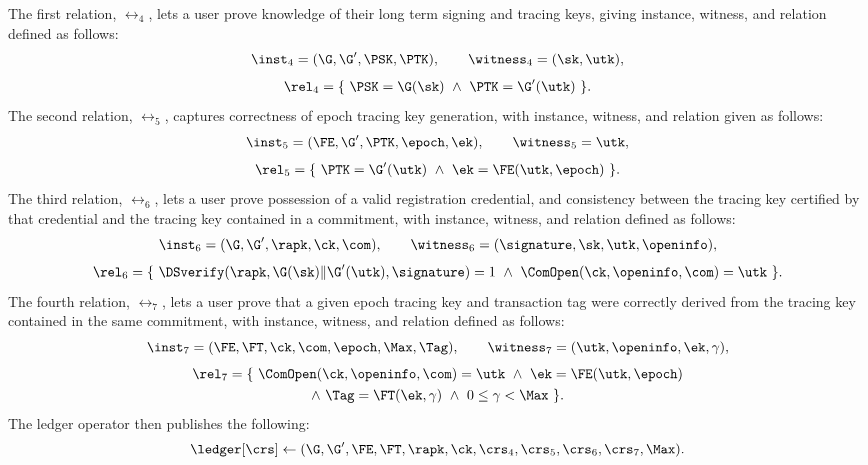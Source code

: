 The first relation, $\rel_4$, lets a user prove knowledge of their long term
signing and tracing keys, giving instance, witness, and relation defined as
follows:
%
\begin{equation}
%
  \inst_4 = (\G, \G', \PSK, \PTK), \qquad \witness_4 = (\sk, \utk),
%
\end{equation}
%
\begin{equation}\label{eq:rel4} \begin{gathered}
%
  \rel_4 = \{\ \PSK = \G(\sk) \ \wedge \ \PTK = \G'(\utk)\ \}.
%
\end{gathered} \end{equation}
%
The second relation, $\rel_5$, captures correctness of epoch tracing key
generation, with instance, witness, and relation given as follows:
%
\begin{equation}
%
  \inst_5 = (\FE, \G', \PTK, \epoch, \ek), \qquad \witness_5 = \utk,
%
\end{equation}
%
\begin{equation}\label{eq:rel5} \begin{gathered}
%
  \rel_5 = \{\ \PTK = \G'(\utk) \ \wedge \ \ek = \FE(\utk, \epoch)\ \}.
%
\end{gathered} \end{equation}
%
The third relation, $\rel_6$, lets a user prove possession of a valid
registration credential, and consistency between the tracing key certified by
that credential and the tracing key contained in a commitment, with instance,
witness, and relation defined as follows:
%
\begin{equation}
%
  \inst_6 = (\G, \G', \rapk, \ck, \com), \qquad \witness_6 = (\signature, \sk,
  \utk, \openinfo),
%
\end{equation}
%
\begin{equation}\label{eq:rel6} \begin{gathered}
%
  \rel_6 = \{\ \DSverify(\rapk, \G(\sk) \| \G'(\utk), \signature) = 1 \ \wedge
  \ \ComOpen(\ck, \openinfo, \com) = \utk\ \}.
%
\end{gathered} \end{equation}
%
The fourth relation, $\rel_7$, lets a user prove that a given epoch tracing key
and transaction tag were correctly derived from the tracing key contained in
the same commitment, with instance, witness, and relation defined as follows:
%
\begin{equation}
%
  \inst_7 = (\FE, \FT, \ck, \com, \epoch, \Max, \Tag), \qquad \witness_7 =
  (\utk, \openinfo, \ek, \gamma),
%
\end{equation}
%
\begin{equation}\label{eq:rel7} \begin{gathered}
%
  \rel_7 = \{\ \ComOpen(\ck, \openinfo, \com) = \utk \ \wedge \ \ek = \FE(\utk,
  \epoch) \\ \wedge \ \Tag = \FT(\ek, \gamma) \ \wedge \ 0 \leq \gamma < \Max\
\}.
%
\end{gathered} \end{equation}
%
The ledger operator then publishes the following:
%
\begin{equation*} \ledger[\crs] \leftarrow (\G, \G', \FE, \FT, \rapk, \ck,
\crs_4, \crs_5, \crs_6, \crs_7, \Max).  \end{equation*}

